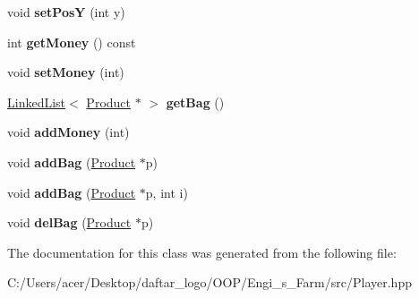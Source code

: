 \begin{DoxyCompactItemize}
void {\bfseries set\+PosY} (int y)
\item 
\mbox{\label{class_player_aed6ceb1d2d434747fbea5a7fc9f829e4}} 
int {\bfseries get\+Money} () const
\item 
\mbox{\label{class_player_ada9de45d0210f1b36a7a3b396cc64129}} 
void {\bfseries set\+Money} (int)
\item 
\mbox{\label{class_player_a8ce3e8e450a249030721a57a9e0ad96d}} 
\mbox{\hyperlink{class_linked_list}{Linked\+List}}$<$ \mbox{\hyperlink{class_product}{Product}} $\ast$ $>$ {\bfseries get\+Bag} ()
\item 
\mbox{\label{class_player_a5b139f6cbbaee1a613b0e5b733202b59}} 
void {\bfseries add\+Money} (int)
\item 
\mbox{\label{class_player_a697bf11e596fea878c2d8762719bf414}} 
void {\bfseries add\+Bag} (\mbox{\hyperlink{class_product}{Product}} $\ast$p)
\item 
\mbox{\label{class_player_a81597f7e1a1311beeecd7f1adc6e2b2e}} 
void {\bfseries add\+Bag} (\mbox{\hyperlink{class_product}{Product}} $\ast$p, int i)
\item 
\mbox{\label{class_player_abfaeb8e5c51b9ea49ede44de9d0d1b45}} 
void {\bfseries del\+Bag} (\mbox{\hyperlink{class_product}{Product}} $\ast$p)
\end{DoxyCompactItemize}


The documentation for this class was generated from the following file\+:\begin{DoxyCompactItemize}
\item 
C\+:/\+Users/acer/\+Desktop/daftar\+\_\+logo/\+O\+O\+P/\+Engi\+\_\+s\+\_\+\+Farm/src/Player.\+hpp\end{DoxyCompactItemize}
